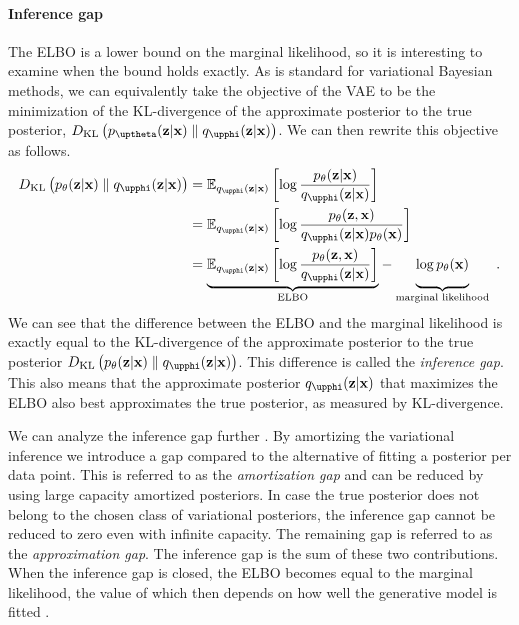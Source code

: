 \paragraph{Inference gap} 
The ELBO is a lower bound on the marginal likelihood, so it is interesting to examine when the bound holds exactly. 
As is standard for variational Bayesian methods, we can equivalently take the objective of the VAE to be the minimization of the KL-divergence of the approximate posterior to the true posterior, $D_\mathrm{KL}\left( p_\thetab(\zb|\xb) \parallel q_\phib(\zb|\xb) \right)$. We can then rewrite this objective as follows.
%
\begin{align}
    D_\text{KL}\left( p_\theta(\zb|\xb) \parallel q_\phib(\zb|\xb) \right)
    &= \mathbb{E}_{q_\phib(\zb|\xb)}\left[ \log \frac{p_\theta(\zb|\xb)}{q_\phib(\zb|\xb)} \right] \nonumber \\
    &= \mathbb{E}_{q_\phib(\zb|\xb)}\left[ \log \frac{p_\theta(\zb,\xb)}{q_\phib(\zb|\xb)p_\theta(\xb)} \right] \nonumber \\
    &= 
    \underset{\text{ELBO}}{\underbrace{
        \mathbb{E}_{q_\phib(\zb|\xb)}\left[ \log \frac{p_\theta(\zb,\xb)}{q_\phib(\zb|\xb)} \right]
    }}
    - 
    \underset{\text{marginal likelihood}}{\underbrace{
        \vphantom{\mathbb{E}_{q_\phib(\zb|\xb)}\left[ \log \frac{p_\theta(\zb,\xb)}{q_\phib(\zb|\xb)} \right]}{\log p_\theta(\xb)}
    }} \enspace .
\end{align}
%
We can see that the difference between the ELBO and the marginal likelihood is exactly equal to the KL-divergence of the approximate posterior to the true posterior $D_\text{KL}\left( p_\theta(\zb|\xb) \parallel q_\phib(\zb|\xb) \right)$. This difference is called the \emph{inference gap}. 
This also means that the approximate posterior $q_\phib(\zb|\xb)$ that maximizes the ELBO also best approximates the true posterior, as measured by KL-divergence. 

We can analyze the inference gap further \cite{cremer_inference_2018}. 
By amortizing the variational inference we introduce a gap compared to the alternative of fitting a posterior per data point. %
This is referred to as the \emph{amortization gap} and can be reduced by using large capacity amortized posteriors. 
In case the true posterior does not belong to the chosen class of variational posteriors, the inference gap cannot be reduced to zero even with infinite capacity. The remaining gap is referred to as the \emph{approximation gap}. The inference gap is the sum of these two contributions. 
When the inference gap is closed, the ELBO becomes equal to the marginal likelihood, the value of which then depends on how well the generative model is fitted \cite{cremer_inference_2018,frellsen_deep_2019}.

